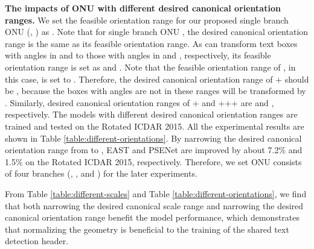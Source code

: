 \documentclass[10pt,twocolumn,letterpaper]{article}
\begin{document}
\textbf{The impacts of ONU with different desired canonical orientation ranges.} We set the feasible orientation range for our proposed single branch ONU (\ie, ) as . Note that for single branch ONU , the desired canonical orientation range is the same as its feasible orientation range. As  can transform text boxes with angles in  and  to those with angles in  and , respectively, its feasible orientation range is set as  and . Note that the feasible orientation range of , in this case, is set to . Therefore, the desired canonical orientation range of + should be , because the boxes with angles are not in these ranges will be transformed by . Similarly, desired canonical orientation ranges of + and +++ are  and , respectively. The models with different desired canonical orientation ranges are trained and tested on the Rotated ICDAR 2015. All the experimental results are shown in Table \ref{table:different-orientations}. By narrowing the desired canonical orientation range from  to , EAST and PSENet are improved by about 7.2\% and 1.5\% on the Rotated ICDAR 2015, respectively. Therefore, we set ONU consists of four branches (, ,  and ) for the later experiments.

From Table \ref{table:different-scales} and Table \ref{table:different-orientations}, we find that both narrowing the desired canonical scale range and narrowing the desired canonical orientation range benefit the model performance, which demonstrates that normalizing the geometry is beneficial to the training of the shared text detection header.
\end{document}
